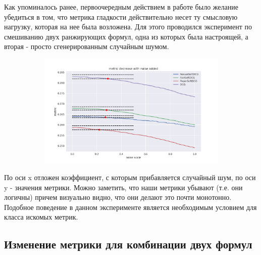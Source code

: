 \documentclass[14pt,a4paper]{amsart}
\theoremstyle{definition}
\theoremstyle{definition}
\begin{document}
Как упоминалось ранее, первоочередным действием в работе было желание убедиться в том, что метрика гладкости действительно несет ту смысловую нагрузку, которая на нее была возложена. Для этого проводился эксперимент по смешиванию двух ранжирующих формул, одна из которых была настроящей, а вторая - просто сгенерированным случайным шумом.

\begin{figure}[!h]
    \centering
    \begin{subfigure}{\textwidth}
    \centering
        \includegraphics[width=\textwidth]{noised_metrics}
     \end{subfigure}
\end{figure}

По оси x отложен коэффициент, с которым прибавляется случайный шум, по оси y - значения метрики. Можно заметить, что наши метрики убывают (т.е. они логичны) причем визуально видно, что они делают это почти монотонно. \\

Подобное поведение в данном эксперименте является необходимым условием для класса искомых метрик.


\subsection{Изменение метрики для комбинации двух формул}
\end{document}
